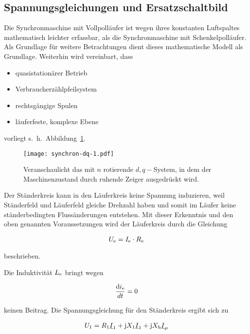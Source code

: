 \subsection{Spannungsgleichungen und Ersatzschaltbild}

Die Synchronmaschine mit Vollpolläufer ist wegen ihres konstanten Luftspaltes mathematisch leichter erfassbar, als die Synchronmaschine mit Schenkelpolläufer.
Als Grundlage für weitere Betrachtungen dient dieses mathematische Modell als Grundlage.
Weiterhin wird vereinbart, dass
\begin{itemize}
	\item quasistationärer Betrieb
	\item Verbraucherzählpfeilsystem
	\item rechtsgängige Spulen
	\item läuferfeste, komplexe Ebene
\end{itemize}

vorliegt s.~h.~Abbildung~\ref{fig:dq-synchron-1}.

\begin{figure}[!h]
\centering
\texttt{[image: synchron-dq-1.pdf]}
\label{fig:dq-synchron-1}
\caption{Veranschaulicht das mit $n$ rotierende $d, q-$System, in dem der Maschinenzustand durch ruhende Zeiger ausgedrückt wird.}
\end{figure}

Der Ständerkreis kann in den Läuferkreis keine Spannung induzieren, weil Ständerfeld und Läuferfeld gleiche Drehzahl haben und somit im Läufer keine ständerbedingten Flussänderungen entstehen.
Mit dieser Erkenntnis und den oben genannten Voraussetzungen wird der Läuferkreis durch die Gleichung

\begin{align}
U_{\mathrm{e}} = I_{\mathrm{e}} \cdot R_{\mathrm{e}}
\end{align}

beschrieben.

Die Induktivität $L_{\mathrm{e}}$ bringt wegen

\begin{align*}
\frac{\mathrm{d}i_{\mathrm{e}}}{dt} = 0
\end{align*}

keinen Beitrag.
Die Spannungsgleichung für den Ständerkreis ergibt sich zu

\begin{align}
U_{\mathrm{1}} = R_{\mathrm{1}}\underline{I}_{\mathrm{1}}+\mathrm{j}X_{\mathrm{1}}\underline{I}_{\mathrm{1}}+\mathrm{j}X_{\mathrm{h}}\underline{I}_\mu
\end{align}

